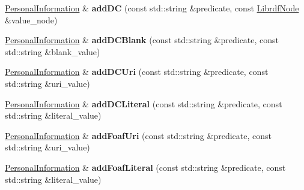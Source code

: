 \begin{DoxyCompactItemize}
\item 
\mbox{\label{classomexmeta_1_1PersonalInformation_a1df32d40f46d98767fc360015bf0f3ed}} 
\hyperlink{classomexmeta_1_1PersonalInformation}{Personal\+Information} \& {\bfseries add\+DC} (const std\+::string \&predicate, const \hyperlink{classredland_1_1LibrdfNode}{Librdf\+Node} \&value\+\_\+node)
\item 
\mbox{\label{classomexmeta_1_1PersonalInformation_a1458c6e092a9436a956ffd6a92c71d16}} 
\hyperlink{classomexmeta_1_1PersonalInformation}{Personal\+Information} \& {\bfseries add\+D\+C\+Blank} (const std\+::string \&predicate, const std\+::string \&blank\+\_\+value)
\item 
\mbox{\label{classomexmeta_1_1PersonalInformation_a1c605320ec0f12dda246cc3abdb0aeae}} 
\hyperlink{classomexmeta_1_1PersonalInformation}{Personal\+Information} \& {\bfseries add\+D\+C\+Uri} (const std\+::string \&predicate, const std\+::string \&uri\+\_\+value)
\item 
\mbox{\label{classomexmeta_1_1PersonalInformation_a843d2eddcdb33fc49d7de5059f5fa04c}} 
\hyperlink{classomexmeta_1_1PersonalInformation}{Personal\+Information} \& {\bfseries add\+D\+C\+Literal} (const std\+::string \&predicate, const std\+::string \&literal\+\_\+value)
\item 
\mbox{\label{classomexmeta_1_1PersonalInformation_a7d760a327fe103386f1bb08063f8795a}} 
\hyperlink{classomexmeta_1_1PersonalInformation}{Personal\+Information} \& {\bfseries add\+Foaf\+Uri} (const std\+::string \&predicate, const std\+::string \&uri\+\_\+value)
\item 
\mbox{\label{classomexmeta_1_1PersonalInformation_ae6fbd4fad2a738fae9fce7affa6b2f15}} 
\hyperlink{classomexmeta_1_1PersonalInformation}{Personal\+Information} \& {\bfseries add\+Foaf\+Literal} (const std\+::string \&predicate, const std\+::string \&literal\+\_\+value)
\item 
\mbox{\label{classomexmeta_1_1PersonalInformation_a99198226df0c8acfdd7bc30ff7c4bf8b}} 

\end{DoxyCompactItemize}
